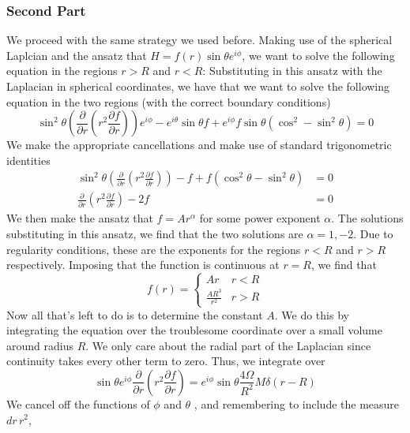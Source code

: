 \subsubsection{Second Part} 
We proceed with the same strategy we used before. 
Making use of the spherical Laplcian and 
the ansatz that $ H = f ( r ) \sin \theta e ^{ i \phi } $, 
we want to solve the following equation 
in the regions $ r  > R $ and $ r < R $: 
Substituting in this ansatz with the Laplacian in spherical 
coordinates, we have that we want to solve the following 
equation in the two regions (with the correct boundary conditions)
\[
\sin ^ 2 \theta \left( \frac{\partial  }{\partial  r }  \left(  r ^ 2 \frac{\partial  f }{\partial  r }   \right) \right) e ^{ i \phi  }  - e ^{ i \theta } \sin \theta f + e ^{ i \phi } f \sin \theta 
\left( \cos ^ 2  - \sin ^ 2 \theta  \right)  = 0 
\] 
We make the appropriate cancellations 
and make use of standard trigonometric 
identities 
\begin{align*} 
\sin ^ 2 \theta \left(  \frac{\partial  }{\partial  r }  \left(  r ^ 2 \frac{\partial  f }{\partial  r }   \right)   \right)   - f + f \left(  \cos ^ 2 \theta  - \sin ^ 2 \theta  \right)   &= 0 \\ 
\frac{\partial  }{\partial  r  }  \left( r ^ 2 \frac{\partial  f }{\partial  r }   \right)   - 2f  & = 0 
\end{align*} 
We then make the ansatz that $ f = A r ^{ \alpha } $ for some power exponent 
$ \alpha $. The solutions substituting in this ansatz, we 
find that the two solutions are $ \alpha = 1, -2 $. Due to 
regularity conditions, these are the exponents for the regions 
$ r < R $ and $ r > R $ respectively. Imposing that 
the function is continuous at  $ r  = R $, 
we find that 
\[
f\left(   r  \right)  = \begin{cases}
A r & r < R \\ 
\frac{ A R ^ 3}{ r ^ 2  } & r > R 
\end{cases}
\] Now all that's left to do is to determine the constant $ A $. 
We do this by integrating the equation over 
the troublesome coordinate over a small 
volume around radius $ R $. We only care about the 
radial part of the Laplacian since 
continuity takes every other term to zero. 
Thus, we integrate over 
\[
\sin \theta e ^{ i \phi } \frac{\partial  }{\partial  r }  \left( r ^ 2 
\frac{\partial  f }{\partial  r }  \right)   =  e^{ i \phi } \sin \theta 
\frac{ 4 \Omega }{ R ^ 2 } M \delta \left( r - R  \right)   
\]   We cancel off the functions of $ \phi $ and $ \theta $
, and remembering to include the measure $ dr \, r ^ 2 $, 
